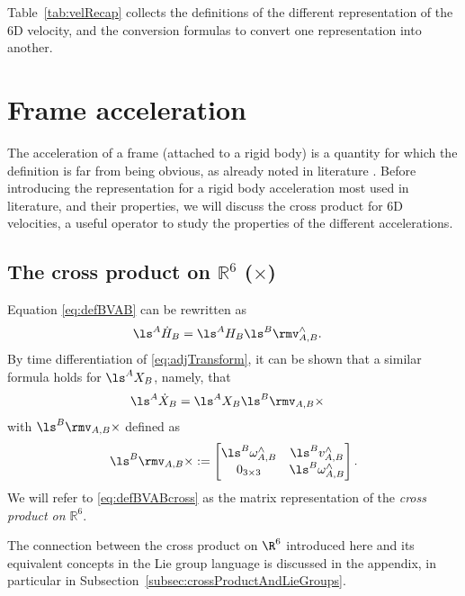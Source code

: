 Table~\ref{tab:velRecap} collects the definitions of the different representation of the 6D velocity, and the conversion formulas to convert one representation into another.


\section{Frame acceleration}
The acceleration of a frame (attached to a rigid body) is a quantity for which the definition is far from being obvious, as already noted in literature \citep{Featherstone2001}. Before introducing the representation for a rigid body acceleration most used in literature, and their properties, we will discuss the cross product for 6D velocities, a useful operator to study the properties of the different accelerations.

\subsection{The cross product on $\mathbb{R}^6$ ($\times$)}
Equation \eqref{eq:defBVAB} can be rewritten as
\begin{align}
  \ls^A{\dot H}_B & = 
  \ls^AH_B \ls^B\rmv_{A,B}^\wedge .
\end{align}
By time differentiation of \eqref{eq:adjTransform}, it can be shown that
a similar formula holds for $\ls^AX_B$, namely, that
\begin{align} \label{eq:dAXBdt}
  \ls^A{\dot X}_B & = 
  \ls^AX_B \ls^B\rmv_{A,B}\times
\end{align}
with $\ls^B\rmv_{A,B}\times$ defined as
\begin{equation}
\label{eq:defBVABcross}
\ls^B\rmv_{A,B} \times := 
\begin{bmatrix}
\ls^B\omega_{A,B}^\wedge & 
\ls^Bv_{A,B}^\wedge \\
0_{3 \times 3} & 
\ls^B\omega_{A,B}^\wedge
\end{bmatrix}.
\end{equation}
We will refer to \eqref{eq:defBVABcross} as
the matrix representation 
of the {\em cross product on $\mathbb{R}^6$}. 

\begin{remark}
The connection between the cross product on $\R^6$ introduced here and its equivalent concepts in the Lie group language is discussed in the appendix, in particular in Subsection~\ref{subsec:crossProductAndLieGroups}.
\end{remark}



